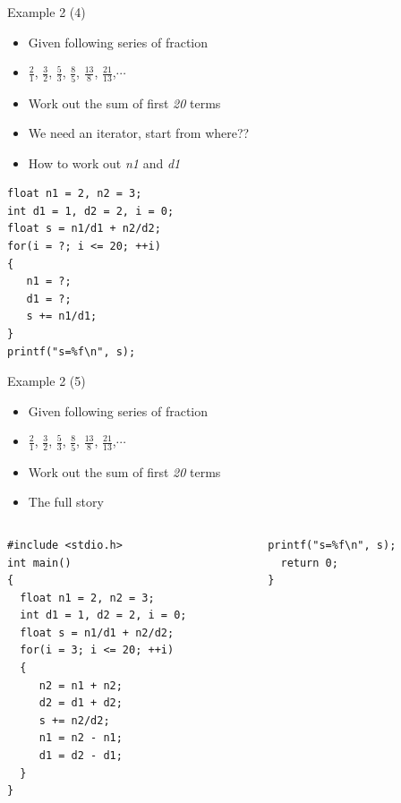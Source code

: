 \begin{frame}[fragile]{Example 2 (4)}
\begin{itemize}
	\item {Given following series of fraction}
	\item {$\frac{2}{1}$, $\frac{3}{2}$, $\frac{5}{3}$, $\frac{8}{5}$, $\frac{13}{8}$, $\frac{21}{13}$,$\cdots$}
	\item {Work out the sum of first \textit{20} terms}
\end{itemize}

\begin{itemize}
	\item {We need an iterator, start from where??}
	\item {How to work out \textit{n1} and \textit{d1}}
\end{itemize}
\begin{lstlisting}[linewidth=0.7\linewidth]
float n1 = 2, n2 = 3;
int d1 = 1, d2 = 2, i = 0;
float s = n1/d1 + n2/d2;
for(i = ?; i <= 20; ++i)
{
   n1 = ?;
   d1 = ?;
   s += n1/d1;
}
printf("s=%f\n", s);
\end{lstlisting}
\end{frame}

\begin{frame}[fragile]{Example 2 (5)}
\begin{itemize}
	\item {Given following series of fraction}
	\item {$\frac{2}{1}$, $\frac{3}{2}$, $\frac{5}{3}$, $\frac{8}{5}$, $\frac{13}{8}$, $\frac{21}{13}$,$\cdots$}
	\item {Work out the sum of first \textit{20} terms}
\end{itemize}

\begin{itemize}
	\item {The full story}
\end{itemize}
\vspace{-0.1in}
\begin{columns}
\begin{column}{0.56\linewidth}
\begin{lstlisting}[linewidth=0.85\linewidth]
#include <stdio.h>
int main()
{
  float n1 = 2, n2 = 3;
  int d1 = 1, d2 = 2, i = 0;
  float s = n1/d1 + n2/d2;
  for(i = 3; i <= 20; ++i)
  {
     n2 = n1 + n2;
     d2 = d1 + d2;
     s += n2/d2;
     n1 = n2 - n1;
     d1 = d2 - d1;
  }
}
\end{lstlisting}
\end{column}
\begin{column}{0.4\linewidth}
\begin{lstlisting}[firstnumber=15]
  printf("s=%f\n", s);
  return 0;
}
\end{lstlisting}
\end{column}
\end{columns}
\end{frame}


